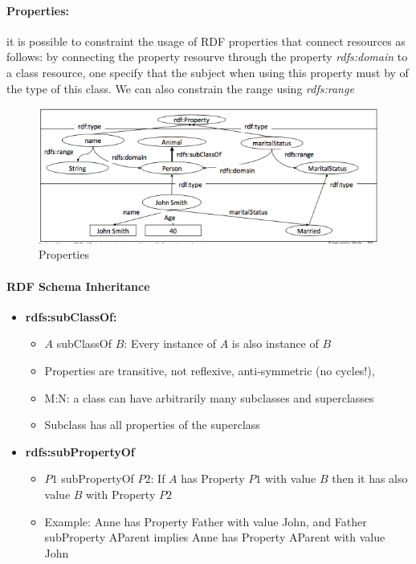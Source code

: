 \paragraph{Properties:} it is possible to constraint the usage of RDF properties that connect resources as follows: by connecting the property resourve through the property \textit{rdfs:domain} to a class resource, one specify that the subject when using this property must by of the type of this class. We can also constrain the range using \textit{rdfs:range}

\begin{figure}[H]
\begin{center}
\includegraphics[width=\textwidth]{figures/properties.png}
\end{center}
\caption{Properties}
\label{fig:class}
\end{figure}

\paragraph{RDF Schema Inheritance} 
\begin{itemize}
	\item \bf{rdfs:subClassOf:}
		\begin{itemize}
			\item $A$ subClassOf $B$: Every instance of $A$ is also instance of $B$
			\item Properties are transitive, not reflexive, anti-symmetric (no cycles!),
			\item M:N: a class can have arbitrarily many subclasses and superclasses
			\item Subclass has all properties of the superclass		
		\end{itemize}
	\item \bf{rdfs:subPropertyOf}
		\begin{itemize}
			\item $P1$ subPropertyOf $P2$: If $A$ has Property $P1$ with value $B$ then it has also value $B$ with Property $P2$
			\item Example: Anne has Property Father with value John, and Father subProperty AParent implies Anne has Property AParent with value John
		\end{itemize}
\end{itemize}

